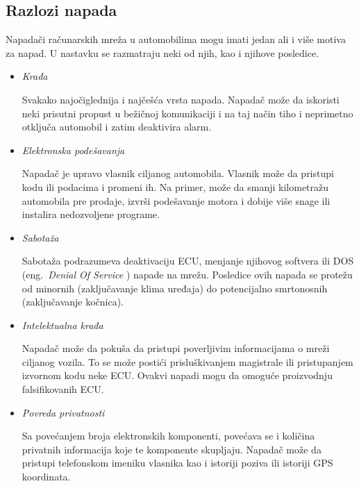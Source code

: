 \documentclass[a4paper]{article}
\begin{document}
\subsection{Razlozi napada}
\label{subsec:napadrazlog}

Napadači računarskih mreža u automobilima mogu imati jedan ali i više motiva za napad. U nastavku se razmatraju neki od njih, kao i njihove posledice. 

\begin{itemize}
  \item[] \textit{Krađa}
  
  Svakako najočiglednija i najčešća vrsta napada. Napadač može da iskoristi neki prisutni propust u bežičnoj komunikaciji i na taj način tiho i neprimetno otključa automobil i zatim deaktivira alarm.
  \item[] \textit{Elektronska podešavanja}
  
  Napadač je upravo vlasnik ciljanog automobila. Vlasnik može da pristupi kodu ili podacima i promeni ih. Na primer, može da smanji kilometražu automobila pre prodaje, izvrši podešavanje motora i dobije više snage ili instalira nedozvoljene programe. %
  \item[] \textit{Sabotaža}
  
  Sabotaža podrazumeva deaktivaciju ECU, menjanje njihovog softvera ili DOS (eng.~{\em Denial Of Service} \cite{DOS}) napade na mrežu. Posledice ovih napada se protežu od minornih (zaključavanje klima uređaja) do potencijalno smrtonosnih (zaključavanje kočnica). %
  \item[] \textit{Intelektualna krađa}
  
  Napadač može da pokuša da pristupi poverljivim informacijama o mreži ciljanog vozila. To se može postići prisluškivanjem magistrale ili pristupanjem izvornom kodu neke ECU. Ovakvi napadi mogu da omoguće proizvodnju falsifikovanih ECU. %
  \item[] \textit{Povreda privatnosti}
  
  Sa povećanjem broja elektronskih komponenti, povećava se i količina privatnih informacija koje te komponente skupljaju. Napadač može da pristupi telefonskom imeniku vlasnika kao i istoriji poziva ili istoriji GPS koordinata. %
  
\end{itemize}
\end{document}

